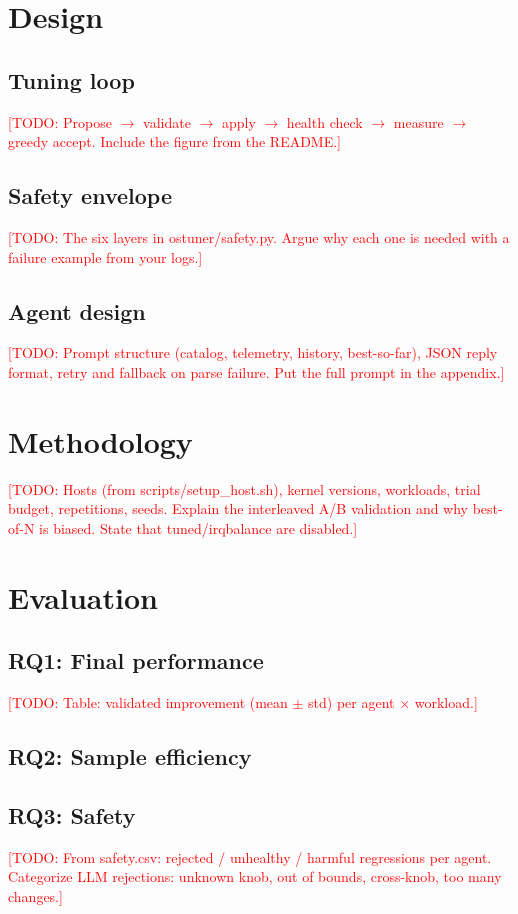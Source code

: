 \documentclass[10pt,twocolumn]{article}
\newcommand{\todo}[1]{\textcolor{red}{[TODO: #1]}}
\begin{document}
\section{Design}
\subsection{Tuning loop}
\todo{Propose $\rightarrow$ validate $\rightarrow$ apply $\rightarrow$ health
check $\rightarrow$ measure $\rightarrow$ greedy accept. Include the figure
from the README.}
\subsection{Safety envelope}
\todo{The six layers in ostuner/safety.py. Argue why each one is needed with a
failure example from your logs.}
\subsection{Agent design}
\todo{Prompt structure (catalog, telemetry, history, best-so-far), JSON reply
format, retry and fallback on parse failure. Put the full prompt in the
appendix.}

\section{Methodology}
\todo{Hosts (from scripts/setup\_host.sh), kernel versions, workloads, trial
budget, repetitions, seeds. Explain the interleaved A/B validation and why
best-of-N is biased. State that tuned/irqbalance are disabled.}

\section{Evaluation}
\subsection{RQ1: Final performance}
% 
\todo{Table: validated improvement (mean $\pm$ std) per agent $\times$ workload.}
\subsection{RQ2: Sample efficiency}
\subsection{RQ3: Safety}
\todo{From safety.csv: rejected / unhealthy / harmful regressions per agent.
Categorize LLM rejections: unknown knob, out of bounds, cross-knob, too many changes.}
\end{document}
